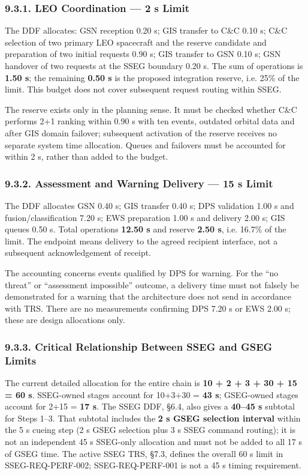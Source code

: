 \subsubsection{9.3.1. LEO Coordination — 2 s Limit}\label{ddjf-9-3-1}

The DDF allocates: GSN reception 0.20 s; GIS transfer to C\&C 0.10 s; C\&C selection of two primary LEO spacecraft and the reserve candidate and preparation of two initial requests 0.90 s; GIS transfer to GSN 0.10 s; GSN handover of two requests at the SSEG boundary 0.20 s. The sum of operations is \textbf{1.50 s}; the remaining \textbf{0.50 s} is the proposed integration reserve, i.e. 25\% of the limit. This budget does not cover subsequent request routing within SSEG.

The reserve exists only in the planning sense. It must be checked whether C\&C performs 2+1 ranking within 0.90 s with ten events, outdated orbital data and after GIS domain failover; subsequent activation of the reserve receives no separate system time allocation. Queues and failovers must be accounted for within 2 s, rather than added to the budget.

\subsubsection{9.3.2. Assessment and Warning Delivery — 15 s Limit}\label{ddjf-9-3-2}

The DDF allocates GSN 0.40 s; GIS transfer 0.40 s; DPS validation 1.00 s and fusion/\allowbreak{}classification 7.20 s; EWS preparation 1.00 s and delivery 2.00 s; GIS queues 0.50 s. Total operations \textbf{12.50 s} and reserve \textbf{2.50 s}, i.e. 16.7\% of the limit. The endpoint means delivery to the agreed recipient interface, not a subsequent acknowledgement of receipt.

The accounting concerns events qualified by DPS for warning. For the “no threat” or “assessment impossible” outcome, a delivery time must not falsely be demonstrated for a warning that the architecture does not send in accordance with TRS. There are no measurements confirming DPS 7.20 s or EWS 2.00 s; these are design allocations only.

\subsubsection{9.3.3. Critical Relationship Between SSEG and GSEG Limits}\label{ddjf-9-3-3}

The current detailed allocation for the entire chain is \textbf{10 + 2 + 3 + 30 + 15 = 60 s}. SSEG-owned stages account for 10+3+30 = \textbf{43 s}; GSEG-owned stages account for 2+15 = \textbf{17 s}. The SSEG DDF, §6.4, also gives a \textbf{40--45 s} subtotal for Steps 1--3. That subtotal includes the \textbf{2 s GSEG selection interval} within the 5 s cueing step (2 s GSEG selection plus 3 s SSEG command routing); it is not an independent 45 s SSEG-only allocation and must not be added to all 17 s of GSEG time. The active SSEG TRS, §7.3, defines the overall 60 s limit in SSEG-REQ-PERF-002; SSEG-REQ-PERF-001 is not a 45 s timing requirement.

